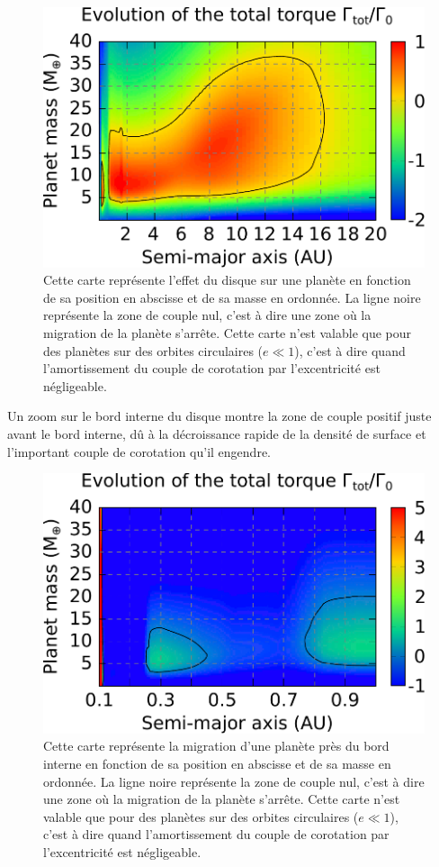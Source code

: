 \begin{figure}[htbp]
\centering
\includegraphics[width=0.65\linewidth]{figure/HSE/HSE_migration_map.pdf}
\caption{Cette carte représente l'effet du disque sur une planète en fonction de sa position en abscisse et de sa masse en ordonnée. La ligne noire représente la zone de couple nul, c'est à dire une zone où la migration de la planète s'arrête. Cette carte n'est valable que pour des planètes sur des orbites circulaires ($e\ll1$), c'est à dire quand l'amortissement du couple de corotation par l'excentricité est négligeable.}\label{fig:migration_map_HSE}
\end{figure}

Un zoom sur le bord interne du disque  montre la zone de couple positif juste avant le bord interne, dû à la décroissance rapide de la densité de surface et l'important couple de corotation qu'il engendre.

\begin{figure}[htbp]
\centering
\includegraphics[width=0.65\linewidth]{figure/HSE/HSE_zoom-in.pdf}
\caption{Cette carte représente la migration d'une planète près du bord interne en fonction de sa position en abscisse et de sa masse en ordonnée. La ligne noire représente la zone de couple nul, c'est à dire une zone où la migration de la planète s'arrête. Cette carte n'est valable que pour des planètes sur des orbites circulaires ($e\ll1$), c'est à dire quand l'amortissement du couple de corotation par l'excentricité est négligeable.}\label{fig:HSE_mig_zoom-in}
\end{figure}

